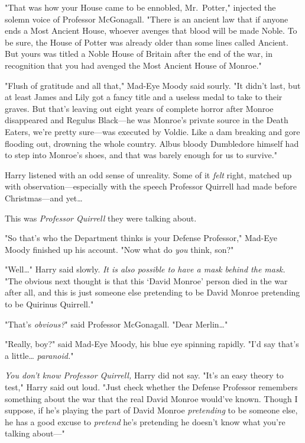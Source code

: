 "That was how your House came to be ennobled, Mr.~Potter," injected the solemn 
voice of Professor McGonagall. "There is an ancient law that if anyone ends a 
Most Ancient House, whoever avenges that blood will be made Noble. To be sure, 
the House of Potter was already older than some lines called Ancient. But yours 
was titled a Noble House of Britain after the end of the war, in recognition 
that you had avenged the Most Ancient House of Monroe."

"Flush of gratitude and all that," Mad-Eye Moody said sourly. "It didn't last, 
but at least James and Lily got a fancy title and a useless medal to take to 
their graves. But that's leaving out eight years of complete horror after 
Monroe disappeared and Regulus Black---he was Monroe's private source in the 
Death Eaters, we're pretty sure---was executed by Voldie. Like a dam breaking 
and gore flooding out, drowning the whole country. Albus bloody Dumbledore 
himself had to step into Monroe's shoes, and that was barely enough for us to 
survive."

Harry listened with an odd sense of unreality. Some of it \emph{felt} right, 
matched up with observation---especially with the speech Professor Quirrell had 
made before Christmas---and yet{\ldots}

This was \emph{Professor Quirrell} they were talking about.

"So that's who the Department thinks is your Defense Professor," Mad-Eye Moody 
finished up his account. "Now what do \emph{you} think, son?"

"Well{\ldots}" Harry said slowly. \emph{It is also possible to have a mask 
behind the mask.} "The obvious next thought is that this `David Monroe' person 
died in the war after all, and this is just someone else pretending to be David 
Monroe pretending to be Quirinus Quirrell."

"That's \emph{obvious?}" said Professor McGonagall. "Dear Merlin{\ldots}"

"Really, boy?" said Mad-Eye Moody, his blue eye spinning rapidly. "I'd say 
that's a little{\ldots} \emph{paranoid.}"

\emph{You don't know Professor Quirrell,} Harry did not say. "It's an easy 
theory to test," Harry said out loud. "Just check whether the Defense Professor 
remembers something about the war that the real David Monroe would've known. 
Though I suppose, if he's playing the part of David Monroe \emph{pretending} to 
be someone else, he has a good excuse to \emph{pretend} he's pretending he 
doesn't know what you're talking about---"

